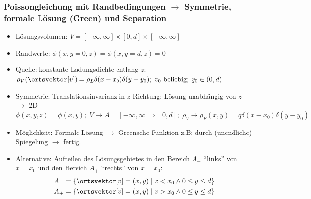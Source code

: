 \begin{frame}
  \frametitle{Poissongleichung mit Randbedingungen $\to$ Symmetrie, formale Lösung (Green) und Separation}

  \begin{itemize}[<+->]
  \item Lösungsvolumen: $V = [-\infty,\infty] \times [0,d]\times [-\infty,\infty]$
  \item Randwerte: $\phi(x,y=0,z)=\phi(x,y=d,z) = 0$
  \item Quelle: konstante Ladungsdichte entlang $z$: $\rho_V (\ortsvektor[v])
    = \rho_L \delta(x-x_0)\delta(y-y_0);\; x_0 \text{ beliebig};\; y_0
    \in (0,d)$
  \item Symmetrie: \alert{Translationsinvarianz} in $z$-Richtung: Lösung unabhängig von $z$ $\to$ \alert{2D}
    $$
    \phi(x,y,z) = \phi(x,y); \; V\to A= [-\infty,\infty] \times [0,d]; \; \rho_V \to \rho_F(x,y) = q \delta(x-x_0)\delta(y-y_0)  
    $$
  \item Möglichkeit: Formale Lösung $\to$ Greensche-Funktion z.B: durch (unendliche) Spiegelung $\to$ fertig.
  \item Alternative: Aufteilen des Lösungsgebietes in den Bereich $A_-$ \enquote{links} von $x=x_0$ und den Bereich $A_+$ \enquote{rechts} von $x=x_0$:
    \begin{align*}
      A_- &= \{\ortsvektor[v] = (x,y)\; |\; x<x_0 \land 0\le y\le d \} \\
      A_+ &= \{\ortsvektor[v] = (x,y)\; |\; x>x_0 \land 0\le y\le d \} 
      \end{align*}
  \end{itemize}
\end{frame}

